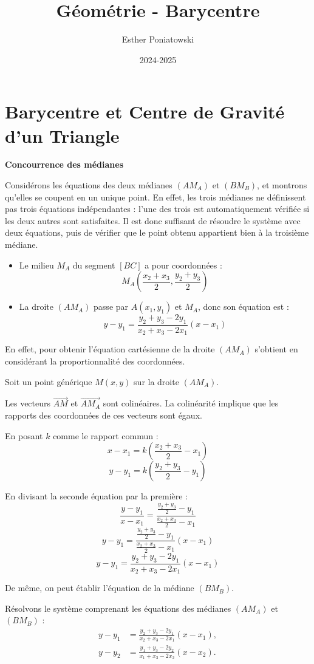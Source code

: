 \documentclass[10pt,a4paper]{article}
\title{Géométrie - Barycentre}
\author{Esther Poniatowski}
\date{2024-2025}
\begin{document}
\section{Barycentre et Centre de Gravité d'un Triangle}

\q \textbf{Concourrence des médianes}
\setcounter{ql}{0}

\ql Considérons les équations des deux médianes $(AM_A)$ et $(BM_B)$, et montrons qu'elles se
coupent en un unique point. En effet, les trois médianes ne définissent pas trois équations
indépendantes : l'une des trois est automatiquement vérifiée si les deux autres sont
satisfaites. Il est donc suffisant de résoudre le système avec deux équations, puis de vérifier que
le point obtenu appartient bien à la troisième médiane.

\begin{itemize}
    \item Le milieu $M_A$ du segment $[BC]$ a pour coordonnées :
    $$
    M_A \left( \frac{x_2 + x_3}{2}, \frac{y_2 + y_3}{2} \right)
    $$
    \item La droite $(AM_A)$ passe par $A(x_1, y_1)$ et $M_A$, donc son équation est :
    $$
    y - y_1 = \frac{y_2 + y_3 - 2y_1}{x_2 + x_3 - 2x_1} (x - x_1)
    $$
\end{itemize}
En effet, pour obtenir l'équation cartésienne de la droite $(AM_A)$ s'obtient en considérant la
proportionnalité des coordonnées.

Soit un point générique $M(x,y)$ sur la droite $(AM_A)$.

Les vecteurs $\overrightarrow{AM}$ et $\overrightarrow{AM_A}$ sont colinéaires.
La colinéarité implique que les rapports des coordonnées de ces vecteurs sont égaux.

En posant $k$ comme le rapport commun :
$$
x - x_1 = k(\frac{x_2 + x_3}{2} - x_1)
$$
$$
y - y_1 = k(\frac{y_2 + y_3}{2} - y_1)
$$

En divisant la seconde équation par la première :
$$
\frac{y - y_1}{x - x_1} = \frac{\frac{y_2 + y_3}{2} - y_1}{\frac{x_2 + x_3}{2} - x_1}
$$
$$
y - y_1 = \frac{\frac{y_2 + y_3}{2} - y_1}{\frac{x_2 + x_3}{2} - x_1}(x - x_1)
$$
$$
y - y_1 = \frac{y_2 + y_3 - 2y_1}{x_2 + x_3 - 2x_1}(x - x_1)
$$



De même, on peut établir l'équation de la médiane $(BM_B)$.

Résolvons le système comprenant les équations des médianes \((AM_A)\) et \((BM_B)\) :
\begin{align*}
y - y_1 &= \frac{y_2 + y_3 - 2y_1}{x_2 + x_3 - 2x_1} (x - x_1), \\
y - y_2 &= \frac{y_1 + y_3 - 2y_2}{x_1 + x_3 - 2x_2} (x - x_2).
\end{align*}
\end{document}
